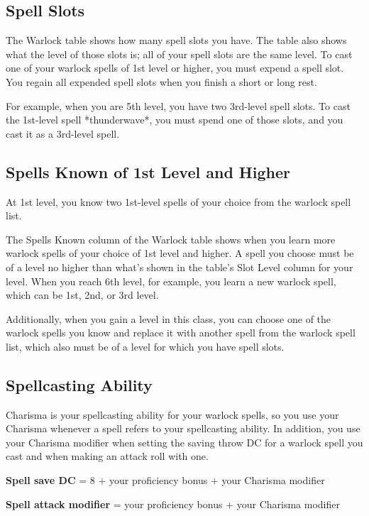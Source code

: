 \subsection{Spell Slots}

The Warlock table shows how many spell slots you have. The table also shows what the level of those slots is; all of your spell slots are the same level. To cast one of your warlock spells of 1st level or higher, you must expend a spell slot. You regain all expended spell slots when you finish a short or long rest.

For example, when you are 5th level, you have two 3rd-level spell slots. To cast the 1st-level spell *thunderwave*, you must spend one of those slots, and you cast it as a 3rd-level spell.

\subsection{Spells Known of 1st Level and Higher}

At 1st level, you know two 1st-level spells of your choice from the warlock spell list.

The Spells Known column of the Warlock table shows when you learn more warlock spells of your choice of 1st level and higher. A spell you choose must be of a level no higher than what’s shown in the table’s Slot Level column for your level. When you reach 6th level, for example, you learn a new warlock spell, which can be 1st, 2nd, or 3rd level.

Additionally, when you gain a level in this class, you can choose one of the warlock spells you know and replace it with another spell from the warlock spell list, which also must be of a level for which you have spell slots.

\subsection{Spellcasting Ability}

Charisma is your spellcasting ability for your warlock spells, so you use your Charisma whenever a spell refers to your spellcasting ability. In addition, you use your Charisma modifier when setting the saving throw DC for a warlock spell you cast and when making an attack roll with one.

\textbf{Spell save DC} = 8 + your proficiency bonus + your Charisma modifier

\textbf{Spell attack modifier} = your proficiency bonus + your Charisma modifier

